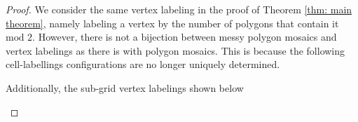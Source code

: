 \documentclass[12pt]{article}
\theoremstyle{plain}
\theoremstyle{definition}
\theoremstyle{remark}
\theoremstyle{definition}
\newcommand{\cell}[4]{ \draw[thick] ( #1 , #2 ) rectangle ( #3 , #4 );}
\newcommand{\lablvertex}[3]{\node[shape=circle,draw=none,fill=white, inner sep=2pt,minimum size=5pt] (A) at ( #1 , #2 ) {#3};}
\begin{document}
\begin{proof}
We consider the same vertex labeling in the proof of Theorem \ref{thm: main theorem}, namely labeling a vertex by the number of polygons that contain it $\text{mod } 2$. However, there is not a bijection between messy polygon mosaics and vertex labelings as there is with polygon mosaics. This is because the following cell-labellings configurations are no longer uniquely determined.

\begin{center}
\end{center}

Additionally, the sub-grid vertex labelings shown below

\begin{center}
\end{center}
\end{proof}
\end{document}
